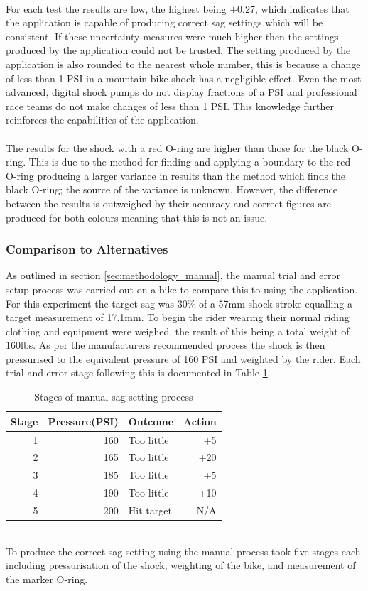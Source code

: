 			\\
			For each test the results are low, the highest being $\pm$0.27, which indicates that the application is capable of producing correct sag settings which will be consistent. If these uncertainty measures were much higher then the settings produced by the application could not be trusted. The setting produced by the application is also rounded to the nearest whole number, this is because a change of less than 1 PSI in a mountain bike shock has a negligible effect. Even the most advanced, digital shock pumps do not display fractions of a PSI and professional race teams do not make changes of less than 1 PSI. This knowledge further reinforces the capabilities of the application.
			\\\\
			The results for the shock with a red O-ring are higher than those for the black O-ring. This is due to the method for finding and applying a boundary to the red O-ring producing a larger variance in results than the method which finds the black O-ring; the source of the variance is unknown. However, the difference between the results is outweighed by their accuracy and correct figures are produced for both colours meaning that this is not an issue.
		\subsubsection{Comparison to Alternatives}
			As outlined in section \ref{sec:methodology_manual}, the manual trial and error setup process was carried out on a bike to compare this to using the application. For this experiment the target sag was 30\% of a 57mm shock stroke equalling a target measurement of 17.1mm. To begin the rider wearing their normal riding clothing and equipment were weighed, the result of this being a total weight of 160lbs. As per the manufacturers recommended process the shock is then pressurised to the equivalent pressure of 160 PSI and weighted by the rider. Each trial and error stage following this is documented in Table \ref{tab:manual_process}.
			\begin{table}[h!]
				\centering
				\caption{Stages of manual sag setting process}
				\label{tab:manual_process}
				\begin{tabular}{|r|r|l|r|}
					\hline
					\bfseries Stage&\bfseries Pressure(PSI)&\bfseries Outcome&\bfseries Action\\
					\hline
					1&160&Too little&+5\\
					2&165&Too little&+20\\
					3&185&Too little&+5\\
					4&190&Too little&+10\\
					5&200&Hit target&N/A\\
					\hline
				\end{tabular}
			\end{table}\\
			To produce the correct sag setting using the manual process took five stages each including pressurisation of the shock, weighting of the bike, and measurement of the marker O-ring.  
